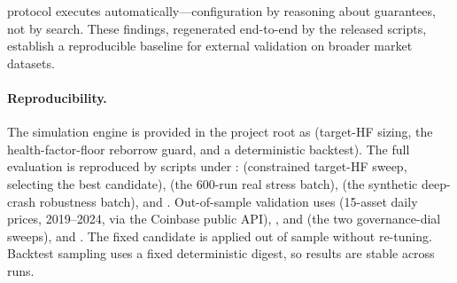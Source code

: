\documentclass[12pt]{article}
\begin{document}
protocol executes automatically---configuration by reasoning about guarantees, not by search. These findings, regenerated end-to-end by the released scripts, establish a reproducible baseline for external validation on broader market datasets.

\paragraph{Reproducibility.}
\label{sec:repro}
The simulation engine is provided in the project root as  (target-HF sizing, the health-factor-floor reborrow guard, and a deterministic backtest). The full evaluation is reproduced by scripts under :  (constrained target-HF sweep, selecting the best candidate),  (the $600$-run real stress batch),  (the synthetic deep-crash robustness batch), and . Out-of-sample validation uses  (15-asset daily prices, 2019--2024, via the Coinbase public API), ,  and  (the two governance-dial sweeps), and . The fixed candidate is applied out of sample without re-tuning. Backtest sampling uses a fixed deterministic digest, so results are stable across runs.

\appendix
\end{document}

